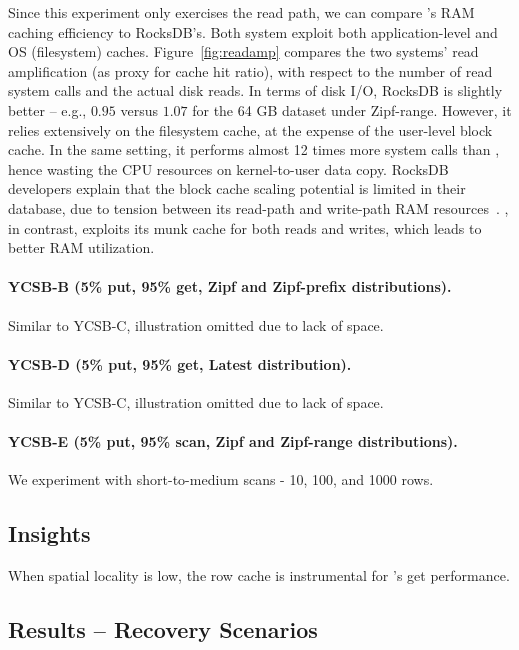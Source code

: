 Since this experiment only exercises the read path, we can compare \sys's RAM caching 
efficiency to RocksDB's. Both system exploit both application-level and OS (filesystem) caches. 
Figure~\ref{fig:readamp} compares the two systems' read amplification (as proxy for cache hit ratio), 
with respect to the number of read system calls and the actual disk reads.  In terms of disk I/O, RocksDB 
is slightly better -- e.g., $0.95$ versus $1.07$ for the 64 GB dataset under Zipf-range. However, it 
relies extensively on the filesystem cache, at the expense of the user-level block cache. In the same
setting, it performs almost 12 times more system calls than \sys, hence wasting the CPU resources on  
kernel-to-user data copy. RocksDB developers explain that the block cache scaling potential is limited in their
database, due to tension between its read-path and write-path RAM resources~\cite{RocksDB-default-blockcache-issue}. 
\sys, in contrast, exploits its munk cache for both reads and writes, which leads to better RAM utilization. 

\paragraph{YCSB-B (5\% put, 95\% get, Zipf and Zipf-prefix distributions).} Similar to YCSB-C, illustration omitted due to 
lack of space. 

\paragraph{YCSB-D (5\% put, 95\% get, Latest distribution).} Similar to YCSB-C, illustration omitted due to lack of space. 

\paragraph{YCSB-E (5\% put, 95\% scan, Zipf and Zipf-range distributions).}
We experiment with short-to-medium scans - 10, 100, and 1000 rows. 

\subsection{Insights}
When spatial locality is low, the row cache is instrumental for \sys's get performance. 

\subsection{Results -- Recovery Scenarios}

